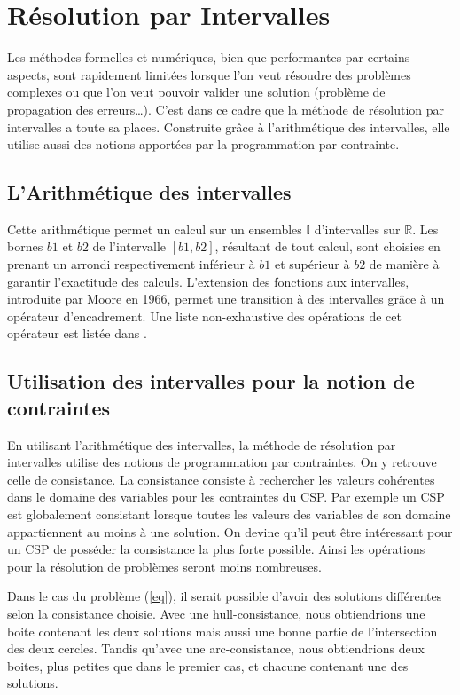 \section{Résolution par Intervalles}
Les méthodes formelles et numériques, bien que performantes par certains aspects, sont rapidement limitées lorsque l'on veut résoudre des problèmes complexes ou que l'on veut pouvoir valider une solution (problème de propagation des erreurs\dots). C'est dans ce cadre que la méthode de résolution par intervalles a toute sa places. Construite grâce à l'arithmétique des intervalles, elle utilise aussi des notions apportées par la programmation par contrainte.
 
\subsection{L'Arithmétique des intervalles}
Cette arithmétique permet un calcul sur un ensembles $\mathbb{I}$ d'intervalles sur $\mathbb{R}$. Les bornes $b1$ et $b2$ de l'intervalle $[b1,b2]$, résultant de tout calcul, sont choisies en prenant un arrondi respectivement inférieur à $b1$ et supérieur à $b2$ de manière à garantir l'exactitude des calculs. L'extension des fonctions aux intervalles, introduite par Moore en 1966, permet une transition à des intervalles grâce à un opérateur d'encadrement. Une liste non-exhaustive des opérations de cet opérateur est listée dans \cite{Goualard}.



\subsection{Utilisation des intervalles pour la notion de contraintes}
En utilisant l'arithmétique des intervalles, la méthode de résolution par intervalles utilise des notions de programmation par contraintes. On y retrouve celle de consistance. La consistance consiste à rechercher les valeurs cohérentes dans le domaine des variables pour les contraintes du CSP. Par exemple un CSP est globalement consistant lorsque toutes les valeurs des variables de son domaine appartiennent au moins à une solution. On devine qu'il peut être intéressant pour un CSP de posséder la consistance la plus forte possible. Ainsi les opérations pour la résolution de problèmes seront moins nombreuses.

Dans le cas du problème (\ref{eq}), il serait possible d'avoir des solutions différentes selon la consistance choisie. Avec une hull-consistance, nous obtiendrions une boite contenant les deux solutions mais aussi une bonne partie de l'intersection des deux cercles. Tandis qu'avec une arc-consistance, nous obtiendrions deux boites, plus petites que dans le premier cas, et chacune contenant une des solutions.


